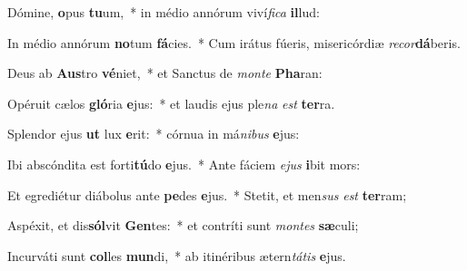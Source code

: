 \item Dómine, \textbf{o}pus \textbf{tu}um,~* in médio annórum viví\textit{fi}\textit{ca} \textbf{il}lud:
\item In médio annórum \textbf{no}tum \textbf{fá}cies.~* Cum irátus fúeris, misericórdiæ \textit{re}\textit{cor}\textbf{dá}beris.
\item Deus ab \textbf{Aus}tro \textbf{vé}niet,~* et Sanctus de \textit{mon}\textit{te} \textbf{Pha}ran:
\item Opéruit cælos \textbf{gló}ria \textbf{e}jus:~* et laudis ejus ple\textit{na} \textit{est} \textbf{ter}ra.
\item Splendor ejus \textbf{ut} lux \textbf{e}rit:~* córnua in má\textit{ni}\textit{bus} \textbf{e}jus:
\item Ibi abscóndita est forti\textbf{tú}do \textbf{e}jus.~* Ante fáciem \textit{e}\textit{jus} \textbf{i}bit mors:
\item Et egrediétur diábolus ante \textbf{pe}des \textbf{e}jus.~* Stetit, et men\textit{sus} \textit{est} \textbf{ter}ram;
\item Aspéxit, et dis\textbf{sól}vit \textbf{Gen}tes:~* et contríti sunt \textit{mon}\textit{tes} \textbf{sæ}culi;
\item Incurváti sunt \textbf{col}les \textbf{mun}di,~* ab itinéribus ætern\textit{tá}\textit{tis} \textbf{e}jus.

